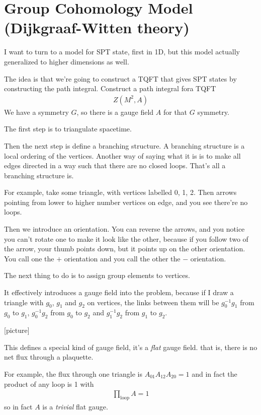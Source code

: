 \section{Group Cohomology Model (Dijkgraaf-Witten theory)}
I want to turn to a model for SPT state,
first in 1D,
but this model actually generalized to higher dimensions as well.

The idea is that we're going to construct a TQFT that gives SPT states
by constructing the path integral.
Construct a path integral fora TQFT
\begin{align}
    Z(M^2, A)
\end{align}
We have a symmetry $G$, so there is a gauge field $A$ for that $G$ symmetry.

The first step is to triangulate spacetime.

Then the next step is define a branching structure.
A branching structure is a local ordering of the vertices.
Another way of saying what it is is to make all edges directed in a way such
that there are no closed loops.
That's all a branching structure is.

For example, take some triangle,
with vertices labelled 0, 1, 2.
Then arrows pointing from lower to higher number vertices on edge,
and you see there're no loops.

Then we introduce an orientation.
You can reverse the arrows,
and you notice you can't rotate one to make it look like the other,
because if you follow two of the arrow,
your thumb points down,
but it points up on the other orientation.
You call one the $+$ orientation and you call the other the $-$ orientation.

The next thing to do is to assign group elements to vertices.

It effectively introduces a gauge field into the problem,
because if I draw a triangle with
$g_0$, $g_1$ and $g_2$ on vertices,
the links between them will be $g_0^{-1}g_1$ from $g_0$ to $g_1$,
$g_{0}^{-1}g_2$ from $g_0$ to $g_2$ and
$g_1^{-1}g_2$ from $g_1$ to $g_2$.

[picture]

This defines a special kind of gauge field,
it's a \emph{flat} gauge field.
that is,
there is no net flux through a plaquette.

For example,
the flux through one triangle is
$A_{01}A_{12}A_{20}=1$
and in fact the product of any loop is 1 with
\begin{align}
    \prod_{\textrm{loop}} A = 1
\end{align}
so in fact $A$ is a \emph{trivial} flat gauge.

